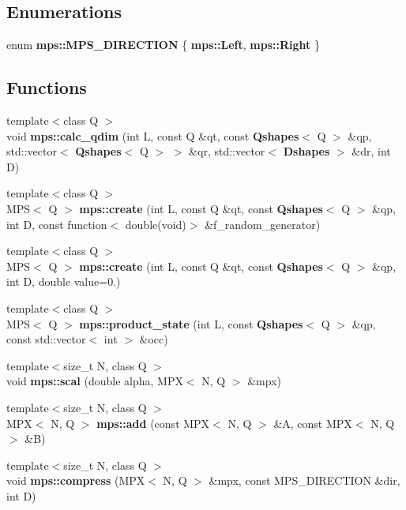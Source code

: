 \subsection*{Enumerations}
\begin{DoxyCompactItemize}
\item 
enum {\bf mps\-::\-M\-P\-S\-\_\-\-D\-I\-R\-E\-C\-T\-I\-O\-N} \{ {\bf mps\-::\-Left}, 
{\bf mps\-::\-Right}
 \}
\end{DoxyCompactItemize}
\subsection*{Functions}
\begin{DoxyCompactItemize}
\item 
{\footnotesize template$<$class Q $>$ }\\void {\bf mps\-::calc\-\_\-qdim} (int L, const Q \&qt, const {\bf Qshapes}$<$ Q $>$ \&qp, std\-::vector$<$ {\bf Qshapes}$<$ Q $>$ $>$ \&qr, std\-::vector$<$ {\bf Dshapes} $>$ \&dr, int D)
\item 
{\footnotesize template$<$class Q $>$ }\\M\-P\-S$<$ Q $>$ {\bf mps\-::create} (int L, const Q \&qt, const {\bf Qshapes}$<$ Q $>$ \&qp, int D, const function$<$ double(void)$>$ \&f\-\_\-random\-\_\-generator)
\item 
{\footnotesize template$<$class Q $>$ }\\M\-P\-S$<$ Q $>$ {\bf mps\-::create} (int L, const Q \&qt, const {\bf Qshapes}$<$ Q $>$ \&qp, int D, double value=0.)
\item 
{\footnotesize template$<$class Q $>$ }\\M\-P\-S$<$ Q $>$ {\bf mps\-::product\-\_\-state} (int L, const {\bf Qshapes}$<$ Q $>$ \&qp, const std\-::vector$<$ int $>$ \&occ)
\item 
{\footnotesize template$<$size\-\_\-t N, class Q $>$ }\\void {\bf mps\-::scal} (double alpha, M\-P\-X$<$ N, Q $>$ \&mpx)
\item 
{\footnotesize template$<$size\-\_\-t N, class Q $>$ }\\M\-P\-X$<$ N, Q $>$ {\bf mps\-::add} (const M\-P\-X$<$ N, Q $>$ \&A, const M\-P\-X$<$ N, Q $>$ \&B)
\item 
{\footnotesize template$<$size\-\_\-t N, class Q $>$ }\\void {\bf mps\-::compress} (M\-P\-X$<$ N, Q $>$ \&mpx, const M\-P\-S\-\_\-\-D\-I\-R\-E\-C\-T\-I\-O\-N \&dir, int D)
\item 

\end{DoxyCompactItemize}
